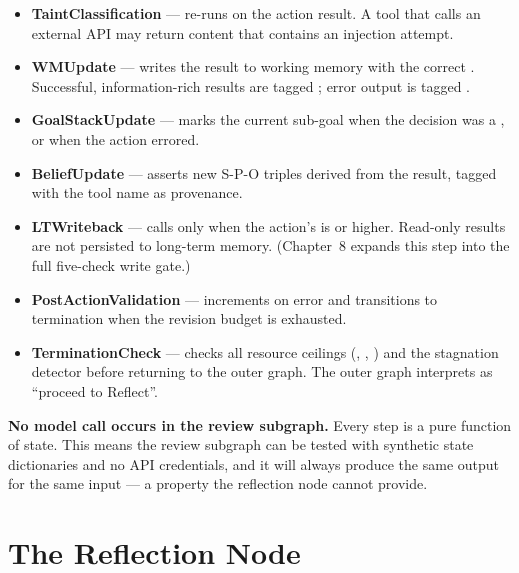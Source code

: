 \begin{itemize}
  \item \textbf{TaintClassification} --- re-runs 
        on the action result.  A tool that calls an external API may return
        content that contains an injection attempt.
  \item \textbf{WMUpdate} --- writes the result to working memory with the
        correct .  Successful, information-rich
        results are tagged ; error output is tagged
        .
  \item \textbf{GoalStackUpdate} --- marks the current sub-goal
         when the decision was a , or
         when the action errored.
  \item \textbf{BeliefUpdate} --- asserts new S-P-O  triples
        derived from the result, tagged with the tool name as provenance.
  \item \textbf{LTWriteback} --- calls  only when the
        action's  is  or
        higher.  Read-only results are not persisted to long-term memory.
        (Chapter~8 expands this step into the full five-check write gate.)
  \item \textbf{PostActionValidation} --- increments
         on error and transitions to
         termination when the revision budget is
        exhausted.
  \item \textbf{TerminationCheck} --- checks all resource ceilings
        (, , ) and
        the stagnation detector before returning 
        to the outer graph.  The outer graph interprets 
        as ``proceed to Reflect''.
\end{itemize}

\begin{notebox}
\textbf{No model call occurs in the review subgraph.}  Every step is a
pure function of state.  This means the review subgraph can be tested
with synthetic state dictionaries and no API credentials, and it will
always produce the same output for the same input --- a property the
reflection node cannot provide.
\end{notebox}

\section{The Reflection Node}
\label{sec:reflect-node}

